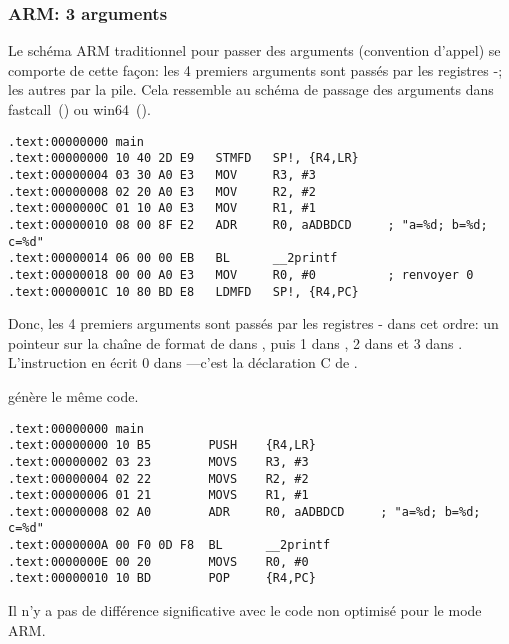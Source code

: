 \subsubsection{ARM: 3 arguments}

Le schéma ARM traditionnel pour passer des arguments (convention d'appel) se
comporte de cette façon:
les 4 premiers arguments sont passés par les registres -; les autres
par la pile.
Cela ressemble au schéma de passage des arguments dans
fastcall~() ou win64~().


\mysubparagraph{\NonOptimizingKeilVI (\ARMMode)}

\begin{lstlisting}[caption=\NonOptimizingKeilVI (\ARMMode),style=customasmARM]
.text:00000000 main
.text:00000000 10 40 2D E9   STMFD   SP!, {R4,LR}
.text:00000004 03 30 A0 E3   MOV     R3, #3
.text:00000008 02 20 A0 E3   MOV     R2, #2
.text:0000000C 01 10 A0 E3   MOV     R1, #1
.text:00000010 08 00 8F E2   ADR     R0, aADBDCD     ; "a=%d; b=%d; c=%d"
.text:00000014 06 00 00 EB   BL      __2printf
.text:00000018 00 00 A0 E3   MOV     R0, #0          ; renvoyer 0
.text:0000001C 10 80 BD E8   LDMFD   SP!, {R4,PC}
\end{lstlisting}

Donc, les 4 premiers arguments sont passés par les registres - dans
cet ordre:
un pointeur sur la chaîne de format de \printf dans , puis 1 dans ,
2 dans  et 3 dans .
L'instruction en  écrit 0 dans ---c'est la déclaration C
de .

\OptimizingKeilVI génère le même code.

\mysubparagraph{\OptimizingKeilVI (\ThumbMode)}

\begin{lstlisting}[caption=\OptimizingKeilVI (\ThumbMode),style=customasmARM]
.text:00000000 main
.text:00000000 10 B5        PUSH    {R4,LR}
.text:00000002 03 23        MOVS    R3, #3
.text:00000004 02 22        MOVS    R2, #2
.text:00000006 01 21        MOVS    R1, #1
.text:00000008 02 A0        ADR     R0, aADBDCD     ; "a=%d; b=%d; c=%d"
.text:0000000A 00 F0 0D F8  BL      __2printf
.text:0000000E 00 20        MOVS    R0, #0
.text:00000010 10 BD        POP     {R4,PC}
\end{lstlisting}

Il n'y a pas de différence significative avec le code non optimisé pour le mode ARM.

